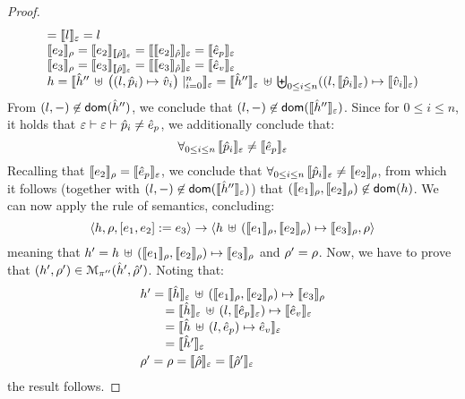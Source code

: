 \begin{proof}
$$\begin{array}{l}
    = \symbeval{\loc}{\senv} = \loc \\ 
  \symbeval{\jsilexpr_2}{\store}  = \symbeval{\jsilexpr_2}{\semexpr{\sstore}{\senv}} =  \symbeval{\symbeval{\jsilexpr_2}{\sstore}}{\senv}
   =  \symbeval{\sexpr_p}{\senv} \\
  \symbeval{\jsilexpr_3}{\store}  = \symbeval{\jsilexpr_3}{\semexpr{\sstore}{\senv}} =  \symbeval{\symbeval{\jsilexpr_3}{\sstore}}{\senv}
   =  \symbeval{\sexpr_v}{\senv} \\
 \heap = \semexpr{\sheap'' \, \uplus \, \big((l, \sexprp_i) \mapsto \sexprv_i\big)\mid_{i = 0}^n}{\senv} 
     = \semexpr{\sheap''}{\senv} \dunion \biguplus_{0 \leq i \leq n} ((l, \symbeval{\sexprp_i}{\senv}) \mapsto \symbeval{\sexprv_i}{\senv})
\end{array}
$$
From  $(\loc, -) \not\in \domain(\sheap'')$, we conclude that $(\loc, -) \not\in \domain(\semexpr{\sheap''}{\senv})$. 
Since  for $0 \leq i \leq n$, it holds that $\senv \vdash \senv \vdash \sexprp_i \neq \sexpr_p$, 
we additionally conclude that: 
$$
  \forall_{0 \leq i \leq n}  \, \symbeval{\sexprp_i}{\senv} \neq \symbeval{\sexpr_p}{\senv} 
$$
Recalling that $\symbeval{\jsilexpr_2}{\store} = \symbeval{\sexpr_p}{\senv}$, we conclude that  
$
  \forall_{0 \leq i \leq n}  \, \symbeval{\sexprp_i}{\senv} \neq \symbeval{\jsilexpr_2}{\store}
$, from which it follows (together with $(\loc, -) \not\in \domain(\semexpr{\sheap''}{\senv})$) that 
$(\symbeval{\jsilexpr_1}{\store}, \symbeval{\jsilexpr_2}{\store}) \not\in \domain(\heap)$.
We can now apply the  rule of \jsil semantics, concluding: 
$$
   \semtrans{\heap, \store, [\jsilexpr_1, \jsilexpr_2] := \jsilexpr_3}
     {\heap \dunion (\symbeval{\jsilexpr_1}{\store}, \symbeval{\jsilexpr_2}{\store}) \mapsto \symbeval{\jsilexpr_3}{\store},  \store}
$$
meaning that $\heap' = \heap \dunion (\symbeval{\jsilexpr_1}{\store}, \symbeval{\jsilexpr_2}{\store}) \mapsto \symbeval{\jsilexpr_3}{\store}$ 
and $\store' = \store$. 
%
Now, we have to prove that $(\heap', \store') \in \smodels{\sheap', \sstore'}{\pc''}$.
Noting that:
$$
\begin{array}{l}
\heap' = \symbeval{\sheap}{\senv} \dunion (\symbeval{\jsilexpr_1}{\store}, \symbeval{\jsilexpr_2}{\store}) \mapsto \symbeval{\jsilexpr_3}{\store} \\ 
  \qquad = \symbeval{\sheap}{\senv} \dunion (\loc, \symbeval{\sexpr_p}{\senv}) \mapsto \symbeval{\sexpr_v}{\senv}  \\
    \qquad = \symbeval{\sheap \dunion (\loc, \sexpr_p) \mapsto \sexpr_v}{\senv}  \\
    \qquad = \symbeval{\sheap'}{\senv} \\[2pt]
 \store' = \store = \symbeval{\sstore}{\senv} = \symbeval{\sstore'}{\senv} 
\end{array}
$$
the result follows. 
\vspace{6pt}




\end{proof}
